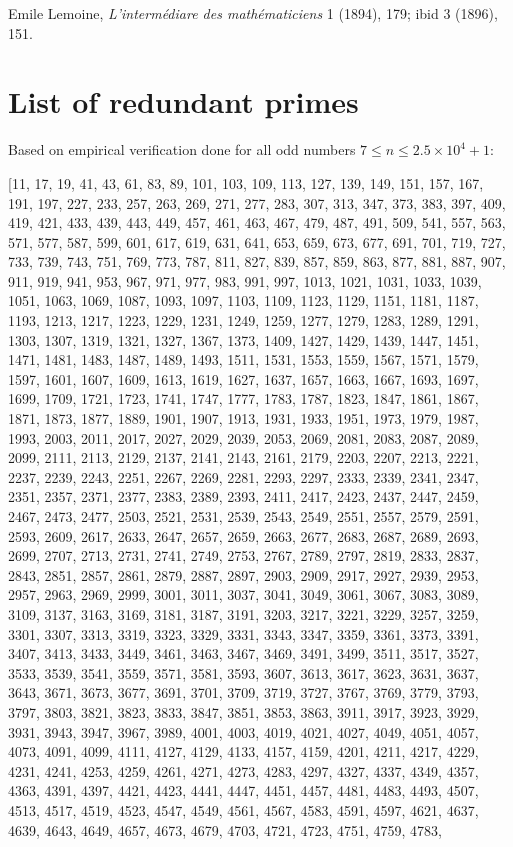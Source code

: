\documentclass[10pt,twocolumn]{article}
\begin{document}
\begin{thebibliography}{9}
  Emile Lemoine, \emph{ L'intermédiare des mathématiciens} 1 (1894), 179; ibid 3 (1896), 151.


\appendix
\section{List of redundant primes}

Based on empirical verification done for all odd numbers $7 \leq n \leq 2.5 \times 10^4 + 1$:

[11, 17, 19, 41, 43, 61, 83, 89, 101, 103, 109, 113, 127, 139, 149, 151, 157, 167, 191, 197, 227, 233, 257, 263, 269, 271, 277, 283, 307, 313, 347, 373, 383, 397, 409, 419, 421, 433, 439, 443, 449, 457, 461, 463, 467, 479, 487, 491, 509, 541, 557, 563, 571, 577, 587, 599, 601, 617, 619, 631, 641, 653, 659, 673, 677, 691, 701, 719, 727, 733, 739, 743, 751, 769, 773, 787, 811, 827, 839, 857, 859, 863, 877, 881, 887, 907, 911, 919, 941, 953, 967, 971, 977, 983, 991, 997, 1013, 1021, 1031, 1033, 1039, 1051, 1063, 1069, 1087, 1093, 1097, 1103, 1109, 1123, 1129, 1151, 1181, 1187, 1193, 1213, 1217, 1223, 1229, 1231, 1249, 1259, 1277, 1279, 1283, 1289, 1291, 1303, 1307, 1319, 1321, 1327, 1367, 1373, 1409, 1427, 1429, 1439, 1447, 1451, 1471, 1481, 1483, 1487, 1489, 1493, 1511, 1531, 1553, 1559, 1567, 1571, 1579, 1597, 1601, 1607, 1609, 1613, 1619, 1627, 1637, 1657, 1663, 1667, 1693, 1697, 1699, 1709, 1721, 1723, 1741, 1747, 1777, 1783, 1787, 1823, 1847, 1861, 1867, 1871, 1873, 1877, 1889, 1901, 1907, 1913, 1931, 1933, 1951, 1973, 1979, 1987, 1993, 2003, 2011, 2017, 2027, 2029, 2039, 2053, 2069, 2081, 2083, 2087, 2089, 2099, 2111, 2113, 2129, 2137, 2141, 2143, 2161, 2179, 2203, 2207, 2213, 2221, 2237, 2239, 2243, 2251, 2267, 2269, 2281, 2293, 2297, 2333, 2339, 2341, 2347, 2351, 2357, 2371, 2377, 2383, 2389, 2393, 2411, 2417, 2423, 2437, 2447, 2459, 2467, 2473, 2477, 2503, 2521, 2531, 2539, 2543, 2549, 2551, 2557, 2579, 2591, 2593, 2609, 2617, 2633, 2647, 2657, 2659, 2663, 2677, 2683, 2687, 2689, 2693, 2699, 2707, 2713, 2731, 2741, 2749, 2753, 2767, 2789, 2797, 2819, 2833, 2837, 2843, 2851, 2857, 2861, 2879, 2887, 2897, 2903, 2909, 2917, 2927, 2939, 2953, 2957, 2963, 2969, 2999, 3001, 3011, 3037, 3041, 3049, 3061, 3067, 3083, 3089, 3109, 3137, 3163, 3169, 3181, 3187, 3191, 3203, 3217, 3221, 3229, 3257, 3259, 3301, 3307, 3313, 3319, 3323, 3329, 3331, 3343, 3347, 3359, 3361, 3373, 3391, 3407, 3413, 3433, 3449, 3461, 3463, 3467, 3469, 3491, 3499, 3511, 3517, 3527, 3533, 3539, 3541, 3559, 3571, 3581, 3593, 3607, 3613, 3617, 3623, 3631, 3637, 3643, 3671, 3673, 3677, 3691, 3701, 3709, 3719, 3727, 3767, 3769, 3779, 3793, 3797, 3803, 3821, 3823, 3833, 3847, 3851, 3853, 3863, 3911, 3917, 3923, 3929, 3931, 3943, 3947, 3967, 3989, 4001, 4003, 4019, 4021, 4027, 4049, 4051, 4057, 4073, 4091, 4099, 4111, 4127, 4129, 4133, 4157, 4159, 4201, 4211, 4217, 4229, 4231, 4241, 4253, 4259, 4261, 4271, 4273, 4283, 4297, 4327, 4337, 4349, 4357, 4363, 4391, 4397, 4421, 4423, 4441, 4447, 4451, 4457, 4481, 4483, 4493, 4507, 4513, 4517, 4519, 4523, 4547, 4549, 4561, 4567, 4583, 4591, 4597, 4621, 4637, 4639, 4643, 4649, 4657, 4673, 4679, 4703, 4721, 4723, 4751, 4759, 4783, 
\end{thebibliography}
\end{document}
